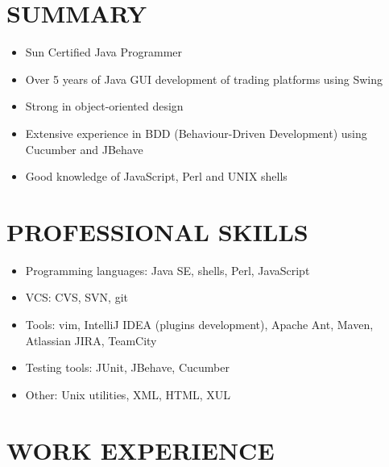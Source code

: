 \documentclass[margin,15pt]{res} %
\newcommand{\gli}[2] {
  {\color{Blue} \href{#1}{#2}}
}
\begin{document}

\address{{\bf Contacts} \\  Saint Petersburg, Russia \\
        \gli{mailto:arkady.galyash@gmail.com?subject=Zalando Job}{arkady.galyash@gmail.com} \\
        +7(921) 553-9890 }
\address{}
\begin{resume}
 
\section{SUMMARY}
  \begin{itemize}
    \item Sun Certified Java Programmer 
    \item Over 5 years of Java GUI development of trading platforms using Swing
    \item Strong in object-oriented design
    \item Extensive experience in BDD (Behaviour-Driven Development) using Cucumber and JBehave
    \item Good knowledge of JavaScript, Perl and UNIX shells
  \end{itemize}
\section{PROFESSIONAL SKILLS} 
  \begin{itemize}
     \item Programming languages: Java SE, shells, Perl, JavaScript
     \item VCS: CVS, SVN, git
     \item Tools: vim, IntelliJ IDEA (plugins development), Apache Ant, Maven, Atlassian JIRA, TeamCity
     \item Testing tools: JUnit, JBehave, Cucumber
     \item Other: Unix utilities, XML, HTML, XUL
  \end{itemize}

\section{WORK EXPERIENCE} 


\end{resume}
\end{document}
